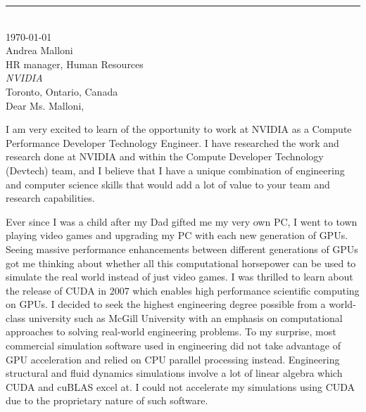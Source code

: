 \documentclass[12pt]{article} %
\begin{document}
\medskip %
\rule[0pt]{\textwidth}{1pt}\\
\today\\[6pt]
Andrea Malloni\\
HR manager, Human Resources\\
\textit{NVIDIA}\\
Toronto, Ontario, Canada\\[6pt] \medskip
Dear Ms. Malloni,

\medskip %

I am very excited to learn of the opportunity to work at NVIDIA as a Compute Performance Developer Technology Engineer. I have researched the work and research done at NVIDIA and within the Compute Developer Technology (Devtech) team, and I believe that I have a unique combination of engineering and computer science skills that would add a lot of value to your team and research capabilities.

\medskip %

Ever since I was a child after my Dad gifted me my very own PC, I went to town playing video games and upgrading my PC with each new generation of GPUs. Seeing massive performance enhancements between different generations of GPUs got me thinking about whether all this computational horsepower can be used to simulate the real world instead of just video games. I was thrilled to learn about the release of CUDA in 2007 which enables high performance scientific computing on GPUs. I decided to seek the highest engineering degree possible from a world-class university such as McGill University with an emphasis on computational approaches to solving real-world engineering problems. To my surprise, most commercial simulation software used in engineering did not take advantage of GPU acceleration and relied on CPU parallel processing instead. Engineering structural and fluid dynamics simulations involve a lot of linear algebra which CUDA and cuBLAS excel at. I could not accelerate my simulations using CUDA due to the proprietary nature of such software.
\end{document}
